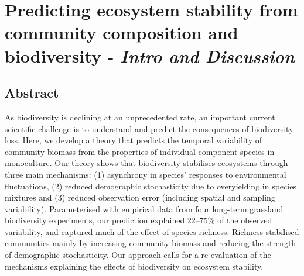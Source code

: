 \section*{Predicting ecosystem stability from community composition and biodiversity \citep{DeMazancourt2013} - \textit{Intro and Discussion}}

\subsection*{Abstract}
As biodiversity is declining at an unprecedented rate, an important current scientific challenge is to understand and predict the consequences of biodiversity loss. Here, we develop a theory that predicts the temporal variability of community biomass from the properties of individual component species in monoculture. Our theory shows that biodiversity stabilises ecosystems through three main mechanisms: (1) asynchrony in species’ responses to environmental fluctuations, (2) reduced demographic stochasticity due to overyielding in species mixtures and (3) reduced observation error (including spatial and sampling variability). Parameterised with empirical data from four long-term grassland biodiversity experiments, our prediction explained 22–75\% of the observed variability, and captured much of the effect of species richness. Richness stabilised communities mainly by increasing community biomass and reducing the strength of demographic stochasticity. Our approach calls for a re-evaluation of the mechanisms explaining the effects of biodiversity on ecosystem stability.


